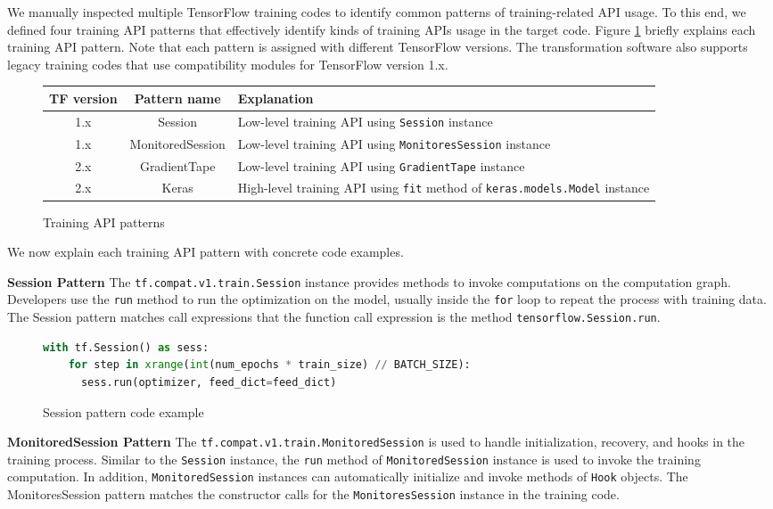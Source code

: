 We manually inspected multiple TensorFlow training codes to identify
common patterns of training-related API usage. 
To this end, we defined four training API patterns
that effectively identify kinds of training APIs usage in the target code.
Figure \ref{tab:patterns} briefly explains each training API pattern.
Note that each pattern is assigned with different TensorFlow versions.
The transformation software also supports legacy training codes
that use compatibility modules for TensorFlow version 1.x.

\begin{figure}
  \centering
  \begin{tabular}{|c|c|l|}
    \hline
    TF version & Pattern name & Explanation \\
    \hline
    1.x & Session & Low-level training API using {\tt Session} instance\\
    \hline
    1.x & MonitoredSession & Low-level training API using {\tt MonitoresSession} instance \\
    \hline
    2.x & GradientTape & Low-level training API using {\tt GradientTape} instance\\
    \hline
    2.x & Keras & High-level training API using {\tt fit} method of {\tt keras.models.Model} instance\\
    \hline
  \end{tabular}
  \caption{Training API patterns}
  \label{tab:patterns}
\end{figure}

We now explain each training API pattern with concrete code examples.

\textbf{Session Pattern} 
The {\tt tf.compat.v1.train.Session} instance provides methods to
invoke computations on the computation graph.
Developers use the {\tt run} method to run the optimization on the model,
usually inside the {\tt for} loop to repeat the process with training data.
The Session pattern matches call expressions that the function
call expression is the method {\tt tensorflow.Session.run}.

\begin{figure}
\begin{lstlisting}[language=Python]
with tf.Session() as sess:
    for step in xrange(int(num_epochs * train_size) // BATCH_SIZE):
      sess.run(optimizer, feed_dict=feed_dict)
\end{lstlisting}
\caption{Session pattern code example}
\end{figure}

\textbf{MonitoredSession Pattern}
The {\tt tf.compat.v1.train.MonitoredSession} is used to handle initialization,
recovery, and hooks in the training process\cite{monitoredsession}.
Similar to the {\tt Session} instance, the {\tt run} method of
{\tt MonitoredSession} instance is used to invoke the training computation.
In addition, {\tt MonitoredSession} instances can automatically
initialize and invoke methods of {\tt Hook} objects.
The MonitoresSession pattern matches the constructor calls for the
{\tt MonitoresSession} instance in the training code.

